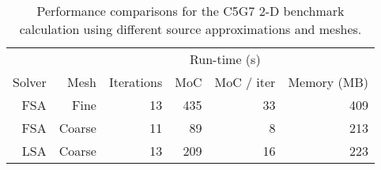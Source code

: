 {{{      \begin{table}[htbp]
        \centering
        \caption{Performance comparisons for the C5G7 2-D benchmark calculation using different source approximations and meshes.}
        \label{tab:LSMOC:C5G7:Performance}
        \begin{tabular}{rrrrrr}\toprule
                 &      &            & \multicolumn{2}{c}{Run-time (s)} & \\\cline{4-5}
          Solver & Mesh & Iterations & MoC & MoC / iter   & Memory (MB)\\\midrule
          FSA    & Fine   & 13         & 435 & 33         & 409\\
          FSA    & Coarse & 11         &  89 &  8         & 213\\
          LSA    & Coarse & 13         & 209 & 16         & 223\\\bottomrule
        \end{tabular}
      \end{table}

}}}

